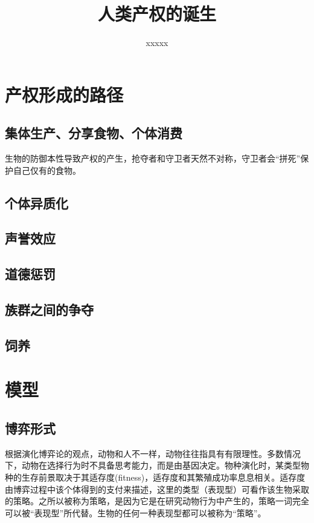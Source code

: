 \documentclass[lang=cn,12pt,a4paper]{elegantpaper}
\title{人类产权的诞生}
\author{xxxxx}
\date{\zhtoday}
\begin{document}
\maketitle

\section{产权形成的路径}
\subsection{集体生产、分享食物、个体消费}

生物的防御本性导致产权的产生，抢夺者和守卫者天然不对称，守卫者会“拼死”保护自己仅有的食物。



\subsection{个体异质化}
\subsection{声誉效应}
\subsection{道德惩罚}
\subsection{族群之间的争夺}
\subsection{饲养}

\section{模型}

\subsection{博弈形式}

根据演化博弈论的观点，动物和人不一样，动物往往指具有有限理性。多数情况下，动物在选择行为时不具备思考能力，而是由基因决定。物种演化时，某类型物种的生存前景取决于其适存度(fitness)，适存度和其繁殖成功率息息相关。适存度由博弈过程中该个体得到的支付来描述，这里的类型（表现型）可看作该生物采取的策略。之所以被称为策略，是因为它是在研究动物行为中产生的，策略一词完全可以被“表现型”所代替。生物的任何一种表现型都可以被称为“策略”。
\end{document}
